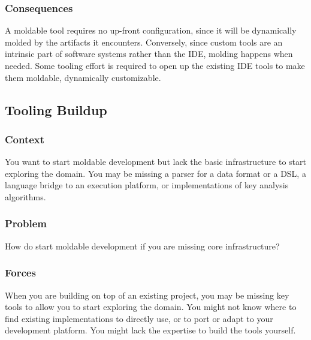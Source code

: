 \documentclass[sigconf]{acmart}
\begin{document}
\subsubsection*{Consequences}
A moldable tool requires no up-front configuration, since it will be dynamically molded by the artifacts it encounters.
Conversely, since custom tools are an intrinsic part of software systems rather than the IDE, molding happens when needed.
Some tooling effort is required to open up the existing IDE tools to make them moldable, \ie dynamically customizable.

\subsection*{Tooling Buildup}\label{pat:toolingBuildup}
\subsubsection*{Context}
You want to start moldable development but lack the basic infrastructure to start exploring the domain.
You may be missing a parser for a data format or a DSL, a language bridge to an execution platform, or implementations of key analysis algorithms. 

\subsubsection*{Problem}
How do start moldable development if you are missing core infrastructure?

\subsubsection*{Forces}
When you are building on top of an existing project, you may be missing key tools to allow you to start exploring the domain.
You might not know where to find existing implementations to directly use, or to port or adapt to your development platform.
You might lack the expertise to build the tools yourself.
\end{document}
